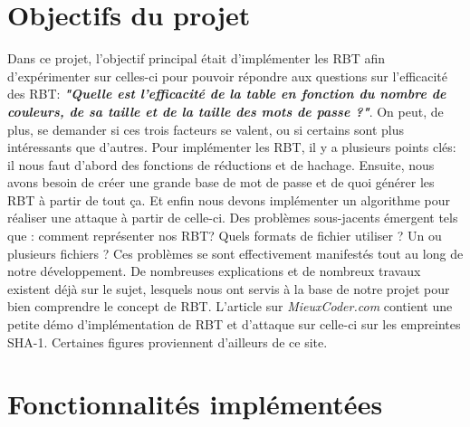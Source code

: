 \documentclass[french,12pt]{article}
\begin{document}
  \section{Objectifs du projet}
        Dans ce projet, l'objectif principal était d'implémenter les RBT afin d'expérimenter sur celles-ci pour pouvoir répondre aux questions sur l'efficacité des RBT: \textit{\textbf{"Quelle est l'efficacité de la table en fonction du nombre de couleurs, de sa taille et de la taille des mots de passe ?"}}. On peut, de plus, se demander si ces trois facteurs se valent, ou si certains sont plus intéressants que d'autres. 
        \newline
        \indent
        Pour implémenter les RBT, il y a plusieurs points clés: il nous faut d'abord des fonctions de réductions et de hachage. Ensuite, nous avons besoin de créer une grande base de mot de passe et de quoi générer les RBT à partir de tout ça. Et enfin nous devons implémenter un algorithme pour réaliser une attaque à partir de celle-ci. Des problèmes sous-jacents émergent tels que : comment représenter nos RBT? Quels formats de fichier utiliser ? Un ou plusieurs fichiers ? Ces problèmes se sont effectivement manifestés tout au long de notre développement.
        \newline
        \indent
        De nombreuses explications et de nombreux travaux existent déjà sur le sujet, lesquels nous ont servis à la base de notre projet pour bien comprendre le concept de RBT\cite{ArticleMieuxCoder}\cite{WikiRBT}. L'article sur \textit{MieuxCoder.com} contient une petite démo d'implémentation de RBT et d'attaque sur celle-ci sur les empreintes SHA-1. Certaines figures proviennent d'ailleurs de ce site. 

    \section{Fonctionnalités implémentées}
\end{document}
